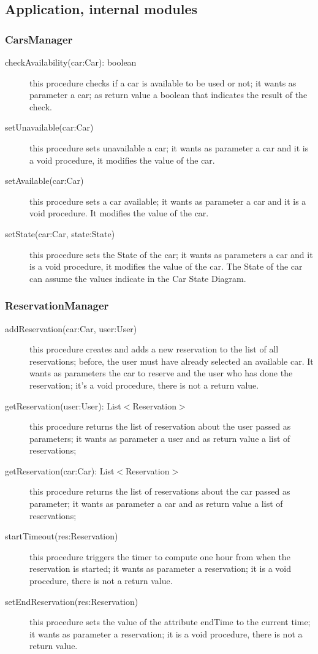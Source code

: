\documentclass{scrreprt}
\begin{document}
\subsection{Application, internal modules}
\subsubsection{CarsManager}
\begin{description}
\item[checkAvailability(car:Car): boolean] this procedure checks if a car is available to be used or not; it wants as parameter a car; as return value a boolean that indicates the result of the check.
\item[setUnavailable(car:Car)] this procedure sets unavailable a car; it wants as parameter a car and it is a void procedure, it modifies the value of the car.
\item[setAvailable(car:Car)] this procedure sets a car available; it wants as parameter a car and it is a void procedure. It modifies the value of the car.
\item[setState(car:Car, state:State)] this procedure sets the State of the car; it wants as parameters a car and it is a void procedure, it modifies the value of the car. The State of the car can assume the values indicate in the Car State Diagram.
\end{description}

\subsubsection{ReservationManager}
\begin{description}
\item[addReservation(car:Car, user:User)] this procedure creates and adds a new reservation to the list of all reservations; before, the user must have already selected an available car. It wants as parameters the car to reserve and the user who has done the reservation; it's a void procedure, there is not a return value.
\item[getReservation(user:User): List$<$Reservation$>$] this procedure returns the list of reservation about the user passed as parameters; it wants as parameter a user and as return value a list of reservations;
\item[getReservation(car:Car): List$<$Reservation$>$] this procedure returns the list of reservations about the car passed  as parameter; it wants as parameter a car and as return value a list of reservations;
\item[startTimeout(res:Reservation)] this procedure triggers the timer to compute one hour from when the reservation is started; it wants as parameter a reservation; it is a void procedure, there is not a return value.
\item[setEndReservation(res:Reservation)] this procedure sets the value of the attribute endTime to the current time; it wants as parameter a reservation; it is a void procedure, there is not a return value.
\end{description}
\end{document}
